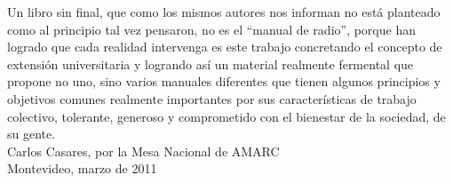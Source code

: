 Un libro sin final, que como los mismos autores nos informan no está planteado como al principio tal vez pensaron, no es el “manual de radio”, porque han logrado que cada realidad intervenga es este trabajo concretando el concepto de extensión universitaria y logrando así un material realmente fermental que propone no uno, sino varios manuales diferentes que tienen algunos principios y objetivos comunes realmente importantes por sus características de trabajo colectivo, tolerante, generoso y comprometido con el bienestar de la sociedad, de su gente.\vspace*{1.5cm}\\


\noindent Carlos Casares, por la Mesa Nacional de AMARC\\
\noindent Montevideo, marzo de 2011
